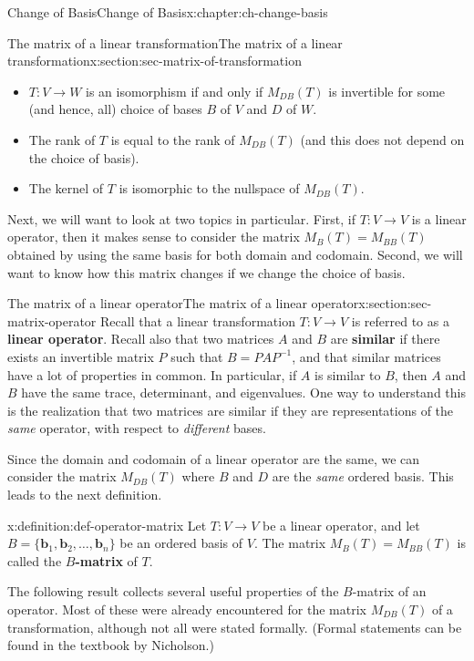 \documentclass[oneside,10pt,]{book}
\newcommand{\terminology}[1]{\textbf{#1}}
\numberwithin{equation}{section}
\newcommand{\basis}[2]{\{\mathbf{#1}_1,\mathbf{#1}_2,\ldots,\mathbf{#1}_{#2}\}}
\begin{document}
\begin{chapterptx}{Change of Basis}{}{Change of Basis}{}{}{x:chapter:ch-change-basis}
\begin{sectionptx}{The matrix of a linear transformation}{}{The matrix of a linear transformation}{}{}{x:section:sec-matrix-of-transformation}
\begin{itemize}[label=\textbullet]
\item{}\(T:V\to W\) is an isomorphism if and only if \(M_{DB}(T)\) is invertible for some (and hence, all) choice of bases \(B\) of \(V\) and \(D\) of \(W\).%
\item{}The rank of \(T\)  is equal to the rank of \(M_{DB}(T)\) (and this does not depend on the choice of basis).%
\item{}The kernel of \(T\) is isomorphic to the nullspace of \(M_{DB}(T)\).%
\end{itemize}
%
\par
Next, we will want to look at two topics in particular. First, if \(T:V\to V\) is a linear operator, then it makes sense to consider the matrix \(M_B(T)=M_{BB}(T)\) obtained by using the same basis for both domain and codomain. Second, we will want to know how this matrix changes if we change the choice of basis.%
\end{sectionptx}
%
%
\typeout{************************************************}
\typeout{************************************************}
%
\begin{sectionptx}{The matrix of a linear operator}{}{The matrix of a linear operator}{}{}{x:section:sec-matrix-operator}
Recall that a linear transformation \(T:V\to V\) is referred to as a \terminology{linear operator}. Recall also that two matrices \(A\) and \(B\) are \terminology{similar} if there exists an invertible matrix \(P\) such that \(B = PAP^{-1}\), and that similar matrices have a lot of properties in common. In particular, if \(A\) is similar to \(B\), then \(A\) and \(B\) have the same trace, determinant, and eigenvalues. One way to understand this is the realization that two matrices are similar if they are representations of the \emph{same} operator, with respect to \emph{different} bases.%
\par
Since the domain and codomain of a linear operator are the same, we can consider the matrix \(M_{DB}(T)\) where \(B\) and \(D\) are the \emph{same} ordered basis. This leads to the next definition.%
\begin{definition}{}{x:definition:def-operator-matrix}%
Let \(T:V\to V\) be a linear operator, and let \(B=\basis{b}{n}\) be an ordered basis of \(V\). The matrix \(M_B(T)=M_{BB}(T)\) is called the \terminology{\(B\)-matrix} of \(T\).%
\end{definition}
The following result collects several useful properties of the \(B\)-matrix of an operator. Most of these were already encountered for the matrix \(M_{DB}(T)\) of a transformation, although not all were stated formally. (Formal statements can be found in the textbook by Nicholson.)%

\end{sectionptx}
\end{chapterptx}
\end{document}
